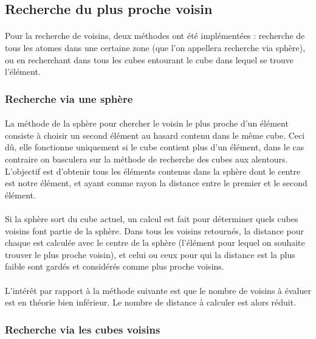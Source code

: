 \subsection{Recherche du plus proche voisin}

\paragraph{}
Pour la recherche de voisins, deux méthodes ont été implémentées : recherche de
tous les atomes dans une certaine zone (que l'on appellera recherche via
sphère), ou en recherchant dans tous les cubes entourant le cube dans lequel se
trouve l'élément.

\subsubsection{Recherche via une sphère}
\paragraph{}
La méthode de la sphère pour chercher le voisin le plus proche d'un élément
consiste à choisir un second élément au hasard contenu dans le même cube. Ceci
dû, elle fonctionne uniquement si le cube contient plus d'un élément, dans le
cas contraire on basculera sur la méthode de recherche des cubes aux alentours.
L'objectif est d'obtenir tous les éléments contenus dans la sphère dont le
centre est notre élément, et ayant comme rayon la distance entre le premier
et le second élément.

\paragraph{}
Si la sphère sort du cube actuel, un calcul est fait pour déterminer quels
cubes voisins font partie de la sphère. Dans tous les voisins retournés, la
distance pour chaque est calculée avec le centre de la sphère (l'élément pour
lequel on souhaite trouver le plus proche voisin), et celui ou ceux pour qui la
distance est la plus faible sont gardés et considérés comme plus proche
voisins.

\paragraph{}
L'intérêt par rapport à la méthode suivante est que le nombre de voisins à
évaluer est en théorie bien inférieur. Le nombre de distance à calculer est
alors réduit.

\subsubsection{Recherche via les cubes voisins}
